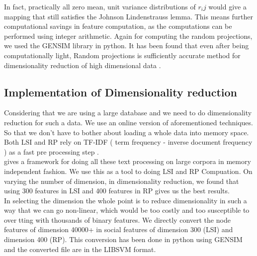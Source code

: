    In fact, practically all zero mean, unit variance distributions of $r_ij$ would give a mapping that still satisfies the Johnson Lindenstrauss
lemma. This means further computational savings in feature computation, as the computations can be performed using integer arithmetic. Again for computing the random projections, we used the GENSIM library \cite{gensim} in python.  
	It has been found that even after being computationally light, Random projections is sufficiently accurate method for dimensionality reduction of high dimensional data \cite{Dasgupta}.
  


\subsection{Implementation of Dimensionality reduction}

Considering that we are using a large database and we need to do dimensionality reduction for such a data. We use an online version of aforementioned techniques. So that we don't have to bother about loading a whole data into memory space. \\
Both LSI and RP rely on TF-IDF ( term frequency - inverse document frequency ) as a fast pre processing step . \\
\cite{radimrehurek} gives a framework \cite{gensim} for doing all these text processing on large corpora in memory independent fashion. We use this as a tool to doing LSI and RP Compuation. On varying the number of dimension, in dimensionality reduction, we found that using 300 features in LSI and 400 features in RP gives us the best results.\\
In selecting the dimension the whole point is to reduce dimensionality in such a way that
we can go non-linear, which would be too costly and too susceptible to overtting with
thousands of binary features.
We directly convert the node features of dimension 40000+ in social features of dimension 300 (LSI) and dimension 400 (RP).  This conversion has been done in python using GENSIM and the converted file are in the LIBSVM format. \\

